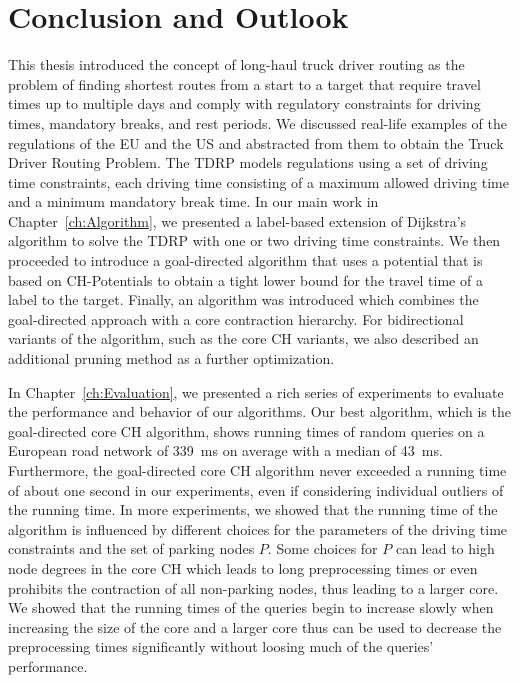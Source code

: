 
\chapter{Conclusion and Outlook}
\label{ch:conclusion}
This thesis introduced the concept of long-haul truck driver routing as the problem of finding shortest routes from a start to a target that require travel times up to multiple days and comply with regulatory constraints for driving times, mandatory breaks, and rest periods. We discussed real-life examples of the regulations of the EU and the US and abstracted from them to obtain the Truck Driver Routing Problem. The TDRP models regulations using a set of driving time constraints, each driving time consisting of a maximum allowed driving time and a minimum mandatory break time. In our main work in Chapter~\ref{ch:Algorithm}, we presented a label-based extension of Dijkstra's algorithm to solve the TDRP with one or two driving time constraints. We then proceeded to introduce a goal-directed algorithm that uses a potential that is based on CH-Potentials to obtain a tight lower bound for the travel time of a label to the target. Finally, an algorithm was introduced which combines the goal-directed approach with a core contraction hierarchy. For bidirectional variants of the algorithm, such as the core CH variants, we also described an additional pruning method as a further optimization.

In Chapter~\ref{ch:Evaluation}, we presented a rich series of experiments to evaluate the performance and behavior of our algorithms. Our best algorithm, which is the goal-directed core CH algorithm, shows running times of random queries on a European road network of \SI{339}{\milli\second} on average with a median of \SI{43}{\milli\second}. Furthermore, the goal-directed core CH algorithm never exceeded a running time of about one second in our experiments, even if considering individual outliers of the running time. In more experiments, we showed that the running time of the algorithm is influenced by different choices for the parameters of the driving time constraints and the set of parking nodes $P$. Some choices for $P$ can lead to high node degrees in the core CH which leads to long preprocessing times or even prohibits the contraction of all non-parking nodes, thus leading to a larger core. We showed that the running times of the queries begin to increase slowly when increasing the size of the core and a larger core thus can be used to decrease the preprocessing times significantly without loosing much of the queries' performance.

